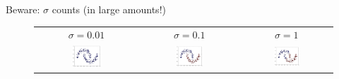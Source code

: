 \bgroup
\begin{frame}{Beware: $\sigma$ counts (in large amounts!)}
\setlength{\tabcolsep}{.07em}
\begin{figure}
\begin{tabular}{ccc}
\small{$\sigma=0.01$} & \small{$\sigma=0.1$} & \small{$\sigma=1$}\\
\includegraphics[width=0.3\textwidth]{img/spectral/sigma_0.pdf}&
\includegraphics[width=0.3\textwidth]{img/spectral/sigma_2.pdf}&
\includegraphics[width=0.3\textwidth]{img/spectral/sigma_4.pdf}
\end{tabular}
\end{figure}
\end{frame}
\egroup
